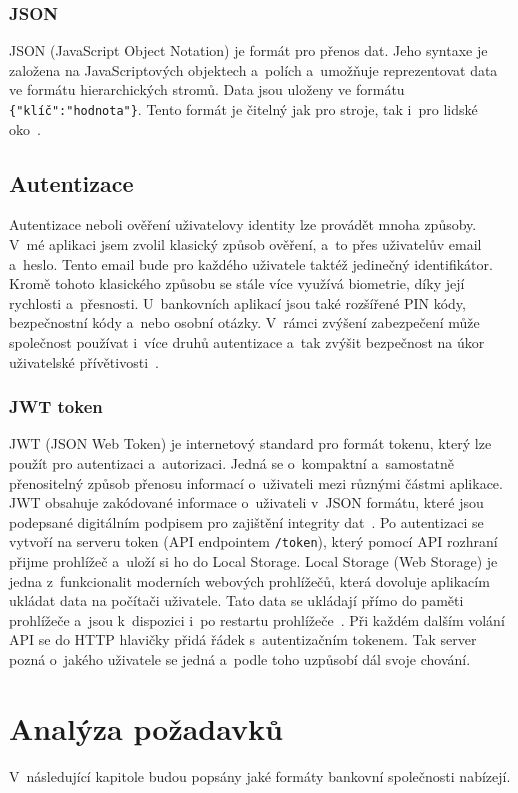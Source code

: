 \subsection{JSON}
JSON (JavaScript Object Notation) je formát pro přenos dat. Jeho syntaxe je založena na JavaScriptových objektech a~polích a~umožňuje reprezentovat data ve formátu hierarchických stromů. Data jsou uloženy ve formátu \texttt{\{"klíč":"hodnota"\}}. Tento formát je čitelný jak pro stroje, tak i~pro lidské oko~\cite{rfcjson}.

\section{Autentizace}
Autentizace neboli ověření uživatelovy identity lze provádět mnoha způsoby. V~mé aplikaci jsem zvolil klasický způsob ověření, a~to přes uživatelův email a~heslo. Tento email bude pro každého uživatele taktéž jedinečný identifikátor. Kromě tohoto klasického způsobu se stále více využívá biometrie, díky její rychlosti a~přesnosti. U~bankovních aplikací jsou také rozšířené PIN kódy, bezpečnostní kódy a~nebo osobní otázky. V~rámci zvýšení zabezpečení může společnost používat i~více druhů autentizace a~tak zvýšit bezpečnost na úkor uživatelské přívětivosti~\cite{dasgupta2017advances}.

\subsection*{JWT token}
JWT (JSON Web Token) je internetový standard pro formát tokenu, který lze použít pro autentizaci a~autorizaci. 
Jedná se o~kompaktní a~samostatně přenositelný způsob přenosu informací o~uživateli mezi různými částmi aplikace. JWT obsahuje zakódované informace o~uživateli v~JSON formátu, které jsou podepsané digitálním podpisem pro zajištění integrity dat~\cite{rfc7519}.
Po autentizaci se vytvoří na serveru token (API endpointem \texttt{/token}), který pomocí API rozhraní přijme prohlížeč a~uloží si ho do Local Storage. Local Storage (Web Storage) je jedna z~funkcionalit moderních webových prohlížečů, která dovoluje aplikacím ukládat data na počítači uživatele. Tato data se ukládají přímo do paměti prohlížeče a~jsou k~dispozici i~po restartu prohlížeče~\cite{shwetank_2013_web}. Při každém dalším volání API se do HTTP hlavičky přidá řádek s~autentizačním tokenem. Tak server pozná o~jakého uživatele se jedná a~podle toho uzpůsobí dál svoje chování.


\chapter{Analýza požadavků}
V~následující kapitole budou popsány jaké formáty bankovní společnosti nabízejí.
